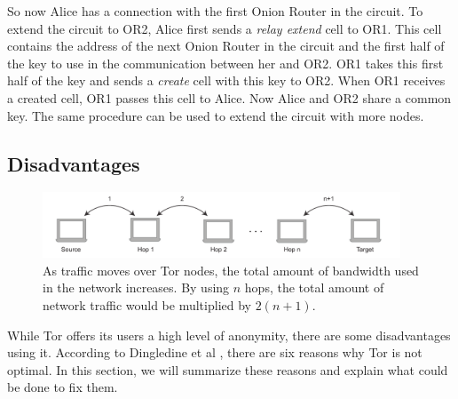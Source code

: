 \documentclass{article}
\begin{document}
		So now Alice has a connection with the first Onion Router in the circuit. To extend the circuit to OR2, Alice first sends a \emph{relay extend} cell to OR1. This cell contains the address of the next Onion Router in the circuit and the first half of the key to use in the communication between her and OR2. OR1 takes this first half of the key and sends a \emph{create} cell with this key to OR2. When OR1 receives a created cell, OR1 passes this cell to Alice. Now Alice and OR2 share a common key. The same procedure can be used to extend the circuit with more nodes.
			
	\subsection{Disadvantages}
		\label{ss:tor_disadvantages}
		
		\begin{figure}[!t]
			\centering
			\includegraphics[width=0.95\textwidth]{graphics/hops.pdf}
			\caption{As traffic moves over Tor nodes, the total amount of bandwidth used in the network increases. By using $n$ hops, the total amount of network traffic would be multiplied by $2(n+1)$.}
			\label{fig:hops}
		\end{figure}

		While Tor offers its users a high level of anonymity, there are some disadvantages using it. According to Dingledine et al \cite{dingledine2009performance}, there are six reasons why Tor is not optimal. In this section, we will summarize these reasons and explain what could be done to fix them.
		
\end{document}
